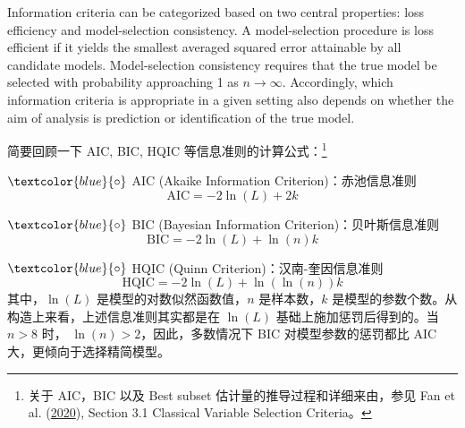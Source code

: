 Information criteria can be categorized based on two central properties: loss efficiency and model-selection consistency. A model-selection procedure is loss efficient if it yields the smallest averaged squared error attainable by all candidate models. Model-selection consistency requires that the true model be selected with probability approaching 1 as $n \rightarrow \infty$. Accordingly, which information criteria is appropriate in a given setting also depends on whether the aim of analysis is prediction or identification of the true model. 
\fi      %

简要回顾一下 AIC, BIC, HQIC 等信息准则的计算公式：\footnote{%
   关于 AIC，BIC 以及 Best subset 估计量的推导过程和详细来由，参见 Fan et al. (\href{https://www.taylorfrancis.com/books/mono/10.1201/9780429096280/statistical-foundations-data-science-jianqing-fan-runze-li-cun-hui-zhang-hui-zou}{2020}), Section 3.1 Classical Variable Selection Criteria。%
}

$\textcolor{blue}{\circ}$ AIC (Akaike Information Criterion)：赤池信息准则
$$\mathrm{AIC} = -2 \ln(L) + 2 k$$

$\textcolor{blue}{\circ}$ BIC (Bayesian Information Criterion)：贝叶斯信息准则
$$\mathrm{BIC}=-2 \ln(L) + \ln(n)k$$

$\textcolor{blue}{\circ}$ HQIC (Quinn Criterion)：汉南-奎因信息准则
$$\mathrm{HQIC}=-2 \ln(L) + \ln(\ln(n))k$$
其中，$\ln(L)$ 是模型的对数似然函数值，$n$ 是样本数，$k$ 是模型的参数个数。从构造上来看，上述信息准则其实都是在 $\ln(L)$ 基础上施加惩罚后得到的。当 $n>8$ 时， $\ln(n)>2$，因此，多数情况下 BIC 对模型参数的惩罚都比 AIC 大，更倾向于选择精简模型。

